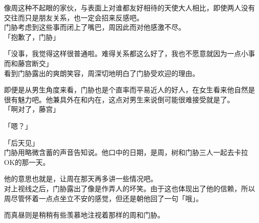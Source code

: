 像周这种不起眼的家伙，与表面上对谁都友好相待的天使大人相比，即使两人没有交往而只是朋友关系，也一定会招来反感吧。\\

门胁考虑到这些事而闭上了嘴巴，周因此而对他感激不尽。\\

「抱歉了，门胁」

「没事，我觉得这样很普通啦。难得关系都这么好了，我也不愿意就因为一点小事而和藤宫断交」\\

看到门胁露出的爽朗笑容，周深切地明白了门胁受欢迎的理由。

即便是从男生角度来看，门胁也是个直率而平易近人的好人，在女生看来他自然是很有魅力吧。他兼具外在和内在，这点对男生来说倒可能很难接受就是了。\\

「啊对了，藤宫」

「嗯？」

「后天见」\\

门胁用略微含蓄的声音告知说。他口中的日期，是周，树和门胁三人一起去卡拉OK的那一天。

他的意思也就是，让周在那天再多讲一些情况吧。\\

对上视线之后，门胁露出了像是作弄人的坏笑。由于这也体现出了他的信赖，所以周尽管怀着一点点坐立不安的感觉，但还是朝他回了一句「哦」。

而真昼则是稍稍有些羡慕地注视着那样的周和门胁。
